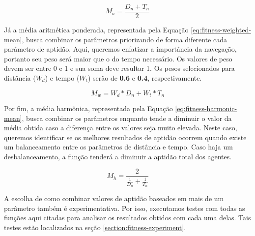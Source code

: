 \begin{equation}
	\label{eq:fitness-mean}
	M_{a} = \frac{D_{n} + T_{n}}{2}
\end{equation}

Já a média aritmética ponderada, representada pela Equação
\ref{eq:fitness-weighted-mean}, busca combinar os parâmetros priorizando de
forma diferente cada parâmetro de aptidão.  Aqui, queremos enfatizar a
importância da navegação, portanto seu peso será maior que o do tempo
necessário. Os valores de peso devem ser entre 0 e 1 e sua soma deve resultar 1.
Os pesos selecionados para distância ($W_{d}$) e tempo ($W_{t}$) serão de
\textbf{0.6} e \textbf{0.4}, respectivamente.

\begin{equation}
	\label{eq:fitness-weighted-mean}
	M_{w} = W_{d}*D_{n} + W_{t}*T_{n}
\end{equation}

Por fim, a média harmônica, representada pela Equação
\ref{eq:fitness-harmonic-mean}, busca combinar os parâmetros enquanto tende a
diminuir o valor da média obtida caso a diferença entre os valores seja muito
elevada. Neste caso, queremos identificar se os melhores resultados de aptidão
ocorrem quando existe um balanceamento entre os parâmetros de distância e tempo.
Caso haja um desbalanceamento, a função tenderá a diminuir a aptidão total dos
agentes.

\begin{equation}
	\label{eq:fitness-harmonic-mean}
	M_{h} = \frac{2}{\frac{1}{D_{n}} + \frac{1}{T_{n}}}
\end{equation}

A escolha de como combinar valores de aptidão baseados em mais de um parâmetro
também é experimentativa. Por isso, executamos testes com todas as funções aqui
citadas para analisar os resultados obtidos com cada uma delas. Tais testes
estão localizados na seção \ref{section:fitness-experiment}.
